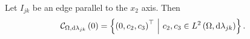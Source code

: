 \begin{prop} \label{prop:CurlZeroSegment}
	Let $I_{jk}$ be an edge parallel to the $x_2$ axis.
	Then
	\begin{align*}
		\mathcal{C}_{ \Omega, \mathrm{d}\lambda_{jk}}\left( 0 \right) &= 
		\left\{  \left( 0, c_2, c_3 \right)^\top \ \middle\vert \  c_2, c_3\in L^{2}\left( \Omega,\mathrm{d}\lambda_{jk} \right)  \right\}.
	\end{align*}
\end{prop}
%	

